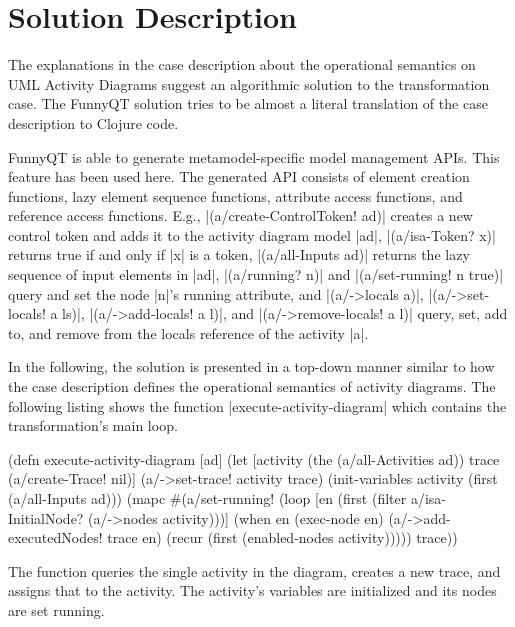 \documentclass[submission]{eptcs}
\newcommand{\code}{\clojureinline}
\begin{document}
\section{Solution Description}
\label{sec:solution-description}

The explanations in the case description about the operational semantics on UML
Activity Diagrams suggest an algorithmic solution to the transformation case.
The FunnyQT solution tries to be almost a literal translation of the case
description to Clojure code.

FunnyQT is able to generate metamodel-specific model management APIs.  This
feature has been used here.  The generated API consists of element creation
functions, lazy element sequence functions, attribute access functions, and
reference access functions.  E.g., \code|(a/create-ControlToken!  ad)| creates
a new control token and adds it to the activity diagram model \code|ad|,
\code|(a/isa-Token? x)| returns true if and only if \code|x| is a token,
\code|(a/all-Inputs ad)| returns the lazy sequence of input elements in
\code|ad|, \code|(a/running? n)| and \code|(a/set-running! n true)| query and
set the node \code|n|'s \textsf{running} attribute, and \code|(a/->locals a)|,
\code|(a/->set-locals! a ls)|, \code|(a/->add-locals! a l)|, and
\code|(a/->remove-locals! a l)| query, set, add to, and remove from the
\textsf{locals} reference of the activity \code|a|.

\bigskip{}

In the following, the solution is presented in a top-down manner similar to how
the case description defines the operational semantics of activity diagrams.
The following listing shows the function \code|execute-activity-diagram| which
contains the transformation's main loop.

\begin{clojurecode}
(defn execute-activity-diagram [ad]
  (let [activity (the (a/all-Activities ad))
        trace (a/create-Trace! nil)]
    (a/->set-trace! activity trace)
    (init-variables activity (first (a/all-Inputs ad)))
    (mapc #(a/set-running! %
    (loop [en (first (filter a/isa-InitialNode? (a/->nodes activity)))]
      (when en
        (exec-node en)
        (a/->add-executedNodes! trace en)
        (recur (first (enabled-nodes activity)))))
    trace))
\end{clojurecode}

The function queries the single activity in the diagram, creates a new trace,
and assigns that to the activity.  The activity's variables are initialized and
its nodes are set running.
\end{document}
